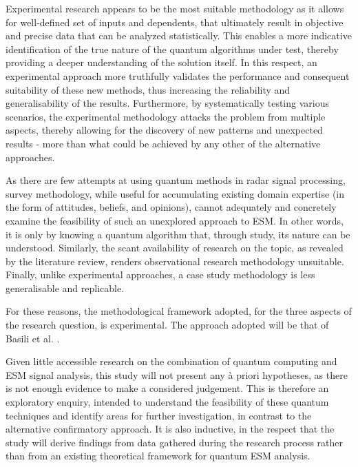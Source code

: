 Experimental research appears to be the most suitable methodology as it allows for well-defined set of inputs and dependents, that ultimately result in objective and precise data that can be analyzed statistically.
This enables a more indicative identification of the true nature of the quantum algorithms under test, thereby providing a deeper understanding of the solution itself.
In this respect, an experimental approach more truthfully validates the performance and consequent suitability of these new methods, thus increasing the reliability and generalisability of the results.
Furthermore, by systematically testing various scenarios, the experimental methodology attacks the problem from multiple aspects, thereby allowing for the discovery of new patterns and unexpected results - more than what could be achieved by any other of the alternative approaches. 

As there are few attempts at using quantum methods in radar signal processing, survey methodology, while useful for accumulating existing domain expertise (in the form of attitudes, beliefs, and opinions), cannot adequately and concretely examine the feasibility of such an unexplored approach to \ac{ESM}.
In other words, it is only by knowing a quantum algorithm that, through study, its nature can be understood.
Similarly, the scant availability of research on the topic, as revealed by the literature review, renders observational research methodology unsuitable.
Finally, unlike experimental approaches, a case study methodology is less generalisable and replicable.

For these reasons, the methodological framework adopted, for the three aspects of the research question, is experimental. 
The approach adopted will be that of Basili et al. \cite{basili_experimentation_1985}.


Given little accessible research on the combination of quantum computing and \ac{ESM} signal analysis, this study will not present any \`{a} priori hypotheses, as there is not enough evidence to make a considered judgement.
This is therefore an exploratory enquiry, intended to understand the feasibility of these quantum techniques and identify areas for further investigation, in contrast to the alternative confirmatory approach.
It is also inductive, in the respect that the study will derive findings from data gathered during the research process rather than from an existing theoretical framework for quantum \ac{ESM} analysis.

